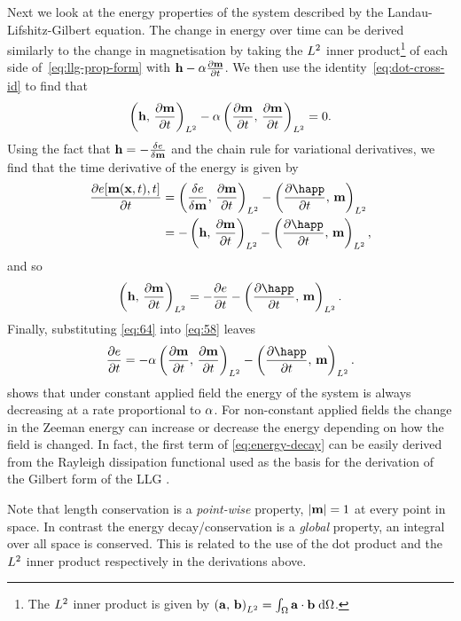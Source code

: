 Next we look at the energy properties of the system described by the Landau-Lifshitz-Gilbert equation.
The change in energy over time can be derived similarly to the change in magnetisation by taking the $L^2$ inner product\footnote{The $L^2$ inner product is given by $\left({\mathbf{a}},\, {\mathbf{b}} \right)_{L^2} = \int_\Omega {\mathbf{a}} \cdot {\mathbf{b}} {\; \text{d}}\Omega$.} of each side of~\cref{eq:llg-prop-form} with $\mathbf{h} - \alpha \frac{\partial \mathbf{m}}{\partial t}$.
We then use the identity~\cref{eq:dot-cross-id} to find that
\begin{equation}
  \label{eq:58}
  \left(\mathbf{h},\, \frac{\partial \mathbf{m}}{\partial t} \right)_{L^2} - \alpha \left(\frac{\partial \mathbf{m}}{\partial t},\, \frac{\partial \mathbf{m}}{\partial t} \right)_{L^2} = 0.
\end{equation}
Using the fact that $\mathbf{h} = -\frac{\delta e}{\delta \mathbf{m}}$ and the chain rule for variational derivatives, we find that the time derivative of the energy is given by
\begin{align*}
  \pd{\e[\mv(\xv, t), t]}{t} &= \ltip{\vd{e}{\mv}}{\dmdt} - \ltip{\pd{\happ}{t}}{\mv} \\
                             &= -\ltip{\hv}{\dmdt} - \ltip{\pd{\happ}{t}}{\mv},
\end{align*}
and so
\begin{equation}
  \ltip{\hv}{\dmdt} = -\pd{\e}{t} - \ltip{\pd{\happ}{t}}{\mv}.
  \label{eq:64}
\end{equation}
Finally, substituting \cref{eq:64} into \cref{eq:58} leaves
\begin{equation}
  \label{eq:energy-decay}
  \pd{\e}{t} = -\dampc \ltip{\dmdt}{\dmdt} - \ltip{\pd{\happ}{t}}{\mv}.
\end{equation}
 shows that under constant applied field the energy of the system is always decreasing at a rate proportional to $\alpha$.
For non-constant applied fields the change in the Zeeman energy can increase or decrease the energy depending on how the field is changed. %
In fact, the first term of \cref{eq:energy-decay} can be easily derived from the Rayleigh dissipation functional used as the basis for the derivation of the Gilbert form of the LLG \cite{Gilbert2004}.

Note that length conservation is a \emph{point-wise} property, \ie $\left|{\mathbf{m}} \right| = 1$ at every point in space. 
In contrast the energy decay/conservation is a \emph{global} property, \ie an integral over all space is conserved.
This is related to the use of the dot product and the $L^2$ inner product respectively in the derivations above.


